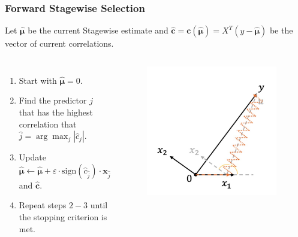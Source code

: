 \begin{frame}
\frametitle{Forward Stagewise Selection}
Let $\hat{\mathbf{\mu}}$ be the current Stagewise estimate and $\hat{\mathbf{c}}=\mathbf{c}(\hat{\mathbf{\mu}})=X^T(y-\hat{\mathbf{\mu}})$ be the vector of current correlations.

\begin{columns}
    \begin{enumerate}
        \item Start with $\hat{\mathbf{\mu}}=0$.
        \item Find the predictor $j$ that has the highest correlation that $\hat{j}=\arg\max_{j}|\hat{c}_j|$.
        \item Update $\hat{\mathbf{\mu}}\leftarrow\hat{\mathbf{\mu}}+\varepsilon\cdot\text{sign}(\hat{c}_{\hat{j}})\cdot\mathbf{x}_{\hat{j}}$ and $\mathbf{\hat{c}}$.
        \item Repeat steps $2-3$ until the stopping criterion is met.
    \end{enumerate}
    
    \begin{figure}[!htbp]
        \begin{center}
            \includegraphics[width=0.95\textwidth]{img/FStageR/2.jpeg}
        \end{center}
    \end{figure}
\end{columns}
\end{frame}

